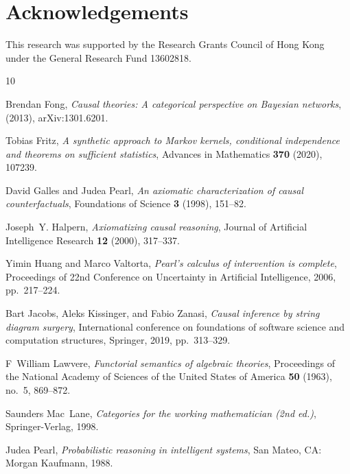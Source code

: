 \documentclass[12pt]{amsart}
\theoremstyle{plain}
\theoremstyle{definition}
\theoremstyle{remark}
\numberwithin{equation}{section}
\theoremstyle{plain}
\newcommand{\0}{\emptyset}
\begin{document}
\section*{Acknowledgements}
This research was supported by the Research Grants Council of Hong Kong
under the General Research Fund 13602818.


\providecommand{\bysame}{\leavevmode\hbox to3em{\hrulefill}\thinspace}
\providecommand{\MR}{\relax\ifhmode\unskip\space\fi MR }
\providecommand{\MRhref}[2]{%
  \href{http://www.ams.org/mathscinet-getitem?mr=#1}{#2}
}
\providecommand{\href}[2]{#2}
\begin{thebibliography}{10}

Brendan Fong, \emph{Causal theories: {A} categorical perspective on {B}ayesian
  networks},  (2013), arXiv:1301.6201.

Tobias Fritz, \emph{A synthetic approach to {M}arkov kernels, conditional
  independence and theorems on sufficient statistics}, Advances in Mathematics
  \textbf{370} (2020), 107239.

David Galles and Judea Pearl, \emph{An axiomatic characterization of causal
  counterfactuals}, Foundations of Science \textbf{3} (1998), 151--82.

Joseph~Y. Halpern, \emph{Axiomatizing causal reasoning}, Journal of Artificial
  Intelligence Research \textbf{12} (2000), 317--337.

Yimin Huang and Marco Valtorta, \emph{Pearl's calculus of intervention is
  complete}, Proceedings of 22nd Conference on Uncertainty in Artificial
  Intelligence, 2006, pp.~217--224.

Bart Jacobs, Aleks Kissinger, and Fabio Zanasi, \emph{Causal inference by
  string diagram surgery}, International conference on foundations of software
  science and computation structures, Springer, 2019, pp.~313--329.

F~William Lawvere, \emph{Functorial semantics of algebraic theories},
  Proceedings of the National Academy of Sciences of the United States of
  America \textbf{50} (1963), no.~5, 869--872.

Saunders Mac~Lane, \emph{Categories for the working mathematician (2nd ed.)},
  Springer-Verlag, 1998.

Judea Pearl, \emph{Probabilistic reasoning in intelligent systems}, San Mateo,
  CA: Morgan Kaufmann, 1988.


\end{thebibliography}
\end{document}
